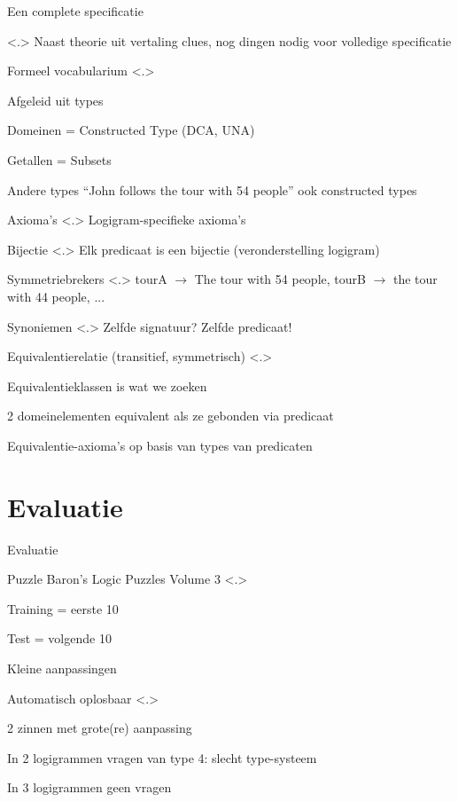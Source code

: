 \documentclass[notes, dvipsnames]{beamer}
\newcommand{\seperation}{
	\vspace{1em}
	\ppause
}
\newcommand{\hitem}{
	\ppause
	\item
}
\newcommand{\ppause}{\onslide<+>}
\newcommand{\nnote}[1]{\note<.>{#1}}
\begin{document}
  \begin{frame}{Een complete specificatie}
    \begin{itemize}
      \ppause
      \nnote{
        Naast theorie uit vertaling clues, nog dingen nodig voor volledige specificatie
      }
      \hitem Formeel vocabularium
      \nnote{
        \item Afgeleid uit types
        \item Domeinen = Constructed Type (DCA, UNA)
        \item Getallen = Subsets
        \item Andere types ``John follows the tour with 54 people'' ook constructed types
      }
      \hitem Axioma's
      \nnote{
        Logigram-specifieke axioma's
      }
      \begin{itemize}
        \hitem Bijectie
        \nnote{
          Elk predicaat is een bijectie (veronderstelling logigram)
        }
        \hitem Symmetriebrekers
        \nnote{
          tourA $\to$ The tour with 54 people, tourB $\to$ the tour with 44 people, ...
        }
        \hitem Synoniemen
        \nnote{
          Zelfde signatuur? Zelfde predicaat!
        }
        \hitem Equivalentierelatie (transitief, symmetrisch)
        \nnote{
          Equivalentieklassen is wat we zoeken
          \item 2 domeinelementen equivalent als ze gebonden via predicaat
          \item Equivalentie-axioma's op basis van types van predicaten
        }
      \end{itemize}
    \end{itemize}
  \end{frame}

  \section{Evaluatie}
  \begin{frame}{Evaluatie}
    \begin{itemize}
      \hitem Puzzle Baron's Logic Puzzles Volume 3 \cite{logigrammen}
      \nnote{
        \item Training = eerste 10
        \item Test = volgende 10
      }

      \seperation
      \item Kleine aanpassingen
      \item Automatisch oplosbaar
      \nnote{
        \item 2 zinnen met grote(re) aanpassing
        \item In 2 logigrammen vragen van type 4: slecht type-systeem
        \item In 3 logigrammen geen vragen
      }
    \end{itemize}
  \end{frame}
\end{document}
